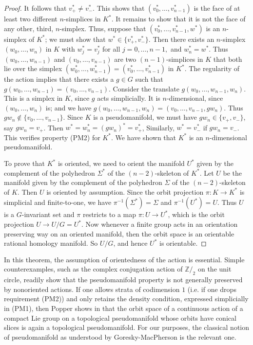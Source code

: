 \documentclass{amsart}
\theoremstyle{definition}
\theoremstyle{remark}
\newcommand {\intg}  {\ensuremath{\mathbb{Z}}}
\begin{document}
\begin{proof}
It follows that $v^*_+ \not= v^*_-.$
This shows that $(v^*_0, \ldots, v^*_{n-1})$ is the face of at least
two different $n$-simplices in $K^*$. 
It remains to show that it is not the face of any other, third, $n$-simplex.
Thus, suppose that
$(v^*_0, \ldots, v^*_{n-1}, w^*)$ is an  $n$-simplex of $K^*$;
we must show that $w^* \in \{ v^*_+, v^*_- \}$.
Then there exists an  $n$-simplex $(w_0, \ldots, w_n)$ in $K$ with
$w^*_j = v^*_j$ for all $j=0,\ldots, n-1,$ and
$w^*_n = w^*$.
Thus $(w_0, \ldots, w_{n-1})$ and $(v_0, \ldots, v_{n-1})$
are two $(n-1)$-simplices in $K$ that both lie over the simplex
$(w^*_0, \ldots, w^*_{n-1}) = (v^*_0, \ldots, v^*_{n-1})$ in $K^*$.
The regularity of the action implies that there exists a $g\in G$
such that
$g (w_0, \ldots, w_{n-1}) = (v_0, \ldots, v_{n-1})$.
Consider the translate $g (w_0, \ldots, w_{n-1}, w_n)$.
This is a simplex in $K$, since $g$ acts simplicially.
It is $n$-dimensional, since $(w_0, \ldots, w_n)$ is; and
we have  $g (w_0, \ldots, w_{n-1}, w_n) =  (v_0, \ldots, v_{n-1}, gw_n)$.
Thus $gw_n \not\in \{ v_0, \ldots, v_{n-1} \}$.
Since $K$ is a pseudomanifold,
we must have $gw_n \in \{ v_+, v_- \}$, say $gw_n = v_+$.
Then $w^* = w^*_n = (gw_n)^* = v^*_+$,
Similarly, $w^* = v^*_-$ if $gw_n = v_-$.
This verifies property (PM2) for $K^*$. We have shown that
$K^*$ is an $n$-dimensional pseudomanifold.

To prove that $K^*$ is oriented, we need to orient the
manifold $U^*$ given by the complement of the polyhedron
$\Sigma^*$ of the $(n-2)$-skeleton of $K^*$.
Let $U$ be the manifold given by the complement of the polyhedron
$\Sigma$ of the $(n-2)$-skeleton of $K$.
Then $U$ is oriented by assumption.
Since the orbit projection $\pi: K \to K^*$ is simplicial and finite-to-one,
we have $\pi^{-1} (\Sigma^*) = \Sigma$ and
$\pi^{-1} (U^*) = U$. Thus $U$ is a $G$-invariant set and
$\pi$ restricts to a map $\pi: U \to U^*$, which is
the orbit projection $U \to U/G = U^*$.
Now whenever a finite group acts in an orientation preserving way on
an oriented manifold, then the orbit space is an orientable 
rational homology manifold. So $U/G$, and hence $U^*$ is orientable.
\end{proof}
In this theorem, the assumption of orientedness of the action
is essential. Simple counterexamples, such as the complex conjugation
action of $\intg/_2$ on the unit circle, readily show that the
pseudomanifold property is not generally preserved by nonoriented actions.
If one allows strata of codimension $1$ (i.e. if one drops requirement (PM2))
and only retains the density condition, expressed simplicially in (PM1),
then Popper shows in \cite[Thm. 3.4]{popper}
that the orbit space of a continuous action of a compact Lie group on a topological
pseudomanifold whose orbits have conical slices is again a topological pseudomanifold.
For our purposes, the classical notion of pseudomanifold as understood
by Goresky-MacPherson \cite{gmih1} is the relevant one.\\
\end{document}
